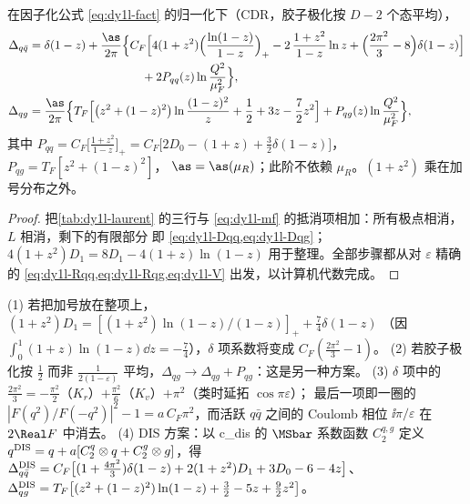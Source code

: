 \begin{proposition}\label{prop:dy1l-coef}
在因子化公式 \cref{eq:dy1l-fact} 的归一化下（CDR，胶子极化按 $D-2$ 个态平均），
\begin{align}
\Delta_{q\bar q}&=\delta(1-z)+\frac{\as}{2\pi}\Big\{C_F\Big[4(1+z^2)\Big(\frac{\ln(1-z)}{1-z}\Big)_+-2\,\frac{1+z^2}{1-z}\ln z+\Big(\frac{2\pi^2}{3}-8\Big)\delta(1-z)\Big]\nonumber\\
&\hspace{9.5em}+2P_{qq}(z)\ln\frac{Q^2}{\mu_F^2}\Big\},\label{eq:dy1l-Dqq}\\
\Delta_{qg}&=\frac{\as}{2\pi}\Big\{T_F\Big[\big(z^2+(1-z)^2\big)\ln\frac{(1-z)^2}{z}+\frac12+3z-\frac72z^2\Big]+P_{qg}(z)\ln\frac{Q^2}{\mu_F^2}\Big\},\label{eq:dy1l-Dqg}
\end{align}
其中 $P_{qq}=C_F\big[\frac{1+z^2}{1-z}\big]_+=C_F\big[2D_0-(1+z)+\frac32\delta(1-z)\big]$，$P_{qg}=T_F[z^2+(1-z)^2]$，
$\as=\as(\mu_R)$；此阶不依赖 $\mu_R$。$(1+z^2)$ 乘在加号分布之外。
\end{proposition}

\begin{proof}
把\cref{tab:dy1l-laurent} 的三行与 \cref{eq:dy1l-mf} 的抵消项相加：所有极点相消，$L$ 相消，剩下的有限部分
即 \cref{eq:dy1l-Dqq,eq:dy1l-Dqg}；$4(1+z^2)D_1=8D_1-4(1+z)\ln(1-z)$ 用于整理。全部步骤都从对 $\varepsilon$ 精确的
\cref{eq:dy1l-Rqq,eq:dy1l-Rqg,eq:dy1l-V} 出发，以计算机代数完成。
\end{proof}

\begin{remark}[有限部分依赖的约定]\label{rem:dy1l-conv}
(1) 若把加号放在整项上，$(1+z^2)D_1=[(1+z^2)\ln(1-z)/(1-z)]_++\frac74\delta(1-z)$
（因 $\int_0^1(1+z)\ln(1-z)\dd z=-\frac74$），$\delta$ 项系数将变成 $C_F(\frac{2\pi^2}{3}-1)$。
(2) 若胶子极化按 $\frac12$ 而非 $\frac{1}{2(1-\varepsilon)}$ 平均，$\Delta_{qg}\to\Delta_{qg}+P_{qg}$：这是另一种方案。
(3) $\delta$ 项中的 $\frac{2\pi^2}{3}=-\frac{\pi^2}{2}$（$K_r$）$+\frac{\pi^2}{6}$（$K_v$）$+\pi^2$（类时延拓 $\cos\pi\varepsilon$）；
最后一项即一圈的 $|F(q^2)/F(-q^2)|^2-1=a\,C_F\pi^2$，而活跃 $q\bar q$ 之间的 Coulomb 相位 $\ii\pi/\varepsilon$ 在 $2\Real F$ 中消去。
(4) DIS 方案：以 c\_dis 的 $\MSbar$ 系数函数 $C_2^{q,g}$ 定义 $q^{\rm DIS}=q+a[C_2^q\otimes q+C_2^g\otimes g]$，得
$\Delta^{\rm DIS}_{q\bar q}=C_F\big[(1+\frac{4\pi^2}{3})\delta(1-z)+2(1+z^2)D_1+3D_0-6-4z\big]$、
$\Delta^{\rm DIS}_{qg}=T_F\big[(z^2+(1-z)^2)\ln(1-z)+\frac32-5z+\frac92z^2\big]$。
\end{remark}

